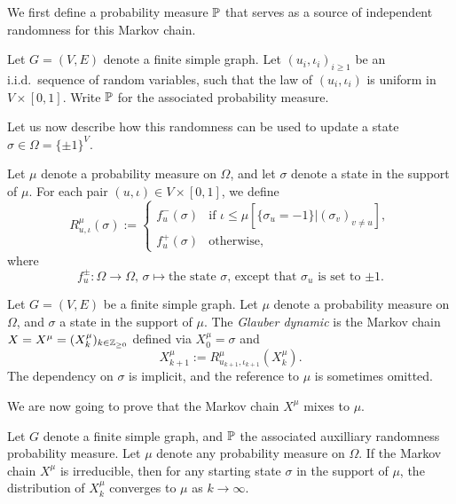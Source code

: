 We first define a probability measure $\P$ that serves as a source of independent
randomness for this Markov chain.

\begin{definition}
    Let $G=(V,E)$ denote a finite simple graph.
    Let $(u_i,\iota_i)_{i\geq 1}$ be an i.i.d.~sequence of random variables,
    such that the law of $(u_i,\iota_i)$ is uniform in $V\times[0,1]$.
    Write $\P$ for the associated probability measure.
\end{definition}

Let us now describe how this randomness can be used to update a state $\sigma\in\Omega=\{\pm1\}^V$.

\begin{definition}
    \label{def:Update map}
    Let $\mu$ denote a probability measure on $\Omega$,
    and let $\sigma$ denote a state in the support of $\mu$.
    For each pair $(u,\iota)\in V\times[0,1]$, we define
    \begin{equation}
        \label{eq:Update map}
        R_{u,\iota}^\mu(\sigma):=
        \begin{cases}
            f_u^-(\sigma) & \text{if $\iota\leq\mu[\{\sigma_u=-1\}|(\sigma_v)_{v\neq u}]$},\\
            f_u^+(\sigma) & \text{otherwise},
        \end{cases}
    \end{equation}
    where \[
        f_u^\pm:\Omega\to\Omega,\,
        \sigma\mapsto
        \text{the state $\sigma$, except that $\sigma_u$ is set to $\pm1$}.
    \]
\end{definition}

\begin{definition}
    Let $G=(V,E)$ be a finite simple graph.
    Let $\mu$ denote a probability measure on $\Omega$,
    and $\sigma$ a state in the support of $\mu$.
    The \emph{Glauber dynamic} is the Markov chain $X=X^\mu=(X^\mu_k)_{k\in\Z_{\geq 0}}$ defined via
    $X^{\mu}_0=\sigma$ and
    \[
        X^{\mu}_{k+1}:=R_{u_{k+1},\iota_{k+1}}^\mu(X^{\mu}_k).
    \]
    The dependency on $\sigma$ is implicit, and the reference to $\mu$ is sometimes omitted.
\end{definition}

We are now going to prove that the Markov chain $X^\mu$ mixes to $\mu$.

\begin{lemma}
    Let $G$ denote a finite simple graph,
    and $\P$ the associated auxilliary randomness probability measure.
    Let $\mu$ denote any probability measure on $\Omega$.
    If the Markov chain $X^\mu$ is irreducible,
    then for any starting state $\sigma$ in the support of $\mu$,
    the distribution of $X^\mu_k$ converges to $\mu$ as $k\to\infty$.
\end{lemma}

